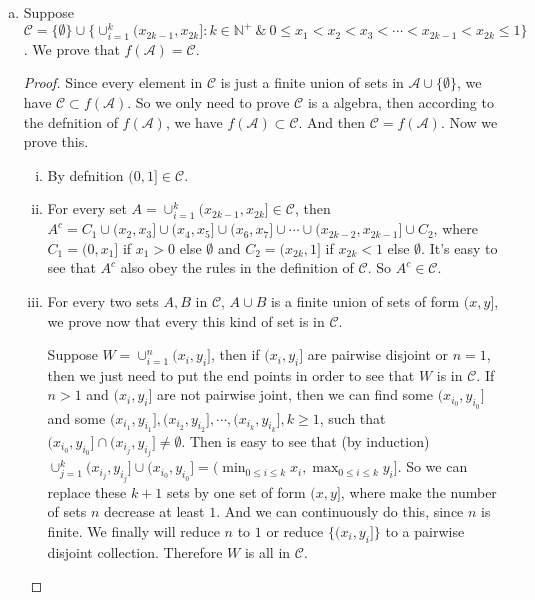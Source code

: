 \documentclass[11pt]{article}
\begin{document}
\begin{enumerate}[1.]
\begin{enumerate}[(a)]
        \item
        Suppose $\mathcal{C} = \{\emptyset\} \cup \{\cup_{i=1}^k (x_{2k-1}, x_{2k}] : k \in \mathbb{N}^+\ \& \ 0 \le x_1 < x_2 < x_3 < \cdots < x_{2k-1} < x_{2k} \le 1\}$.
        We prove that $f(\mathcal{A}) = \mathcal{C}$.
        \begin{proof}
            Since every element in $\mathcal{C}$ is just a finite union of sets in $\mathcal{A} \cup \{\emptyset\}$, we have $\mathcal{C} \subset f(\mathcal{A})$.
            So we only need to prove $\mathcal{C}$ is a algebra, then according to the defnition of $f(\mathcal{A})$, we have $f(\mathcal{A}) \subset \mathcal{C}$.
            And then $\mathcal{C} = f(\mathcal{A})$. Now we prove this.
            \begin{enumerate}[i.]
                \item By defnition $(0,1] \in \mathcal{C}$.
                \item For every set $A = \cup_{i=1}^k (x_{2k-1}, x_{2k}] \in \mathcal{C}$, then $A^c = C_1 \cup (x_2,x_3] \cup (x_4,x_5] \cup (x_6,x_7] \cup \cdots \cup (x_{2k-2},x_{2k-1}] \cup C_2$, where $C_1 = (0,x_1]$ if $x_1 > 0$ else $\emptyset$ and $C_2 = (x_{2k},1]$ if $x_{2k} < 1$ else $\emptyset$.
                It's easy to see that $A^c$ also obey the rules in the definition of $\mathcal{C}$.
                So $A^c \in \mathcal{C}$.
                \item For every two sets $A, B$ in $\mathcal{C}$, $A \cup B$ is a finite union of sets of form $(x,y]$, we prove now that every this kind of set is in $\mathcal{C}$.

                Suppose $W = \cup_{i=1}^n (x_i, y_i]$, then if $(x_i, y_i]$ are pairwise disjoint or $n = 1$, then we just need to put the end points in order to see that $W$ is in $\mathcal{C}$.
                If $n > 1$ and $(x_i, y_i]$ are not pairwise joint, then we can find some $(x_{i_0},y_{i_0}]$ and some $(x_{i_1},y_{i_1}],(x_{i_2},y_{i_2}], \cdots ,(x_{i_k},y_{i_k}], k \ge 1$, such that $(x_{i_0},y_{i_0}] \cap (x_{i_j},y_{i_j}] \neq \emptyset$.
                Then is easy to see that (by induction) $\cup_{j=1}^k (x_{i_j},y_{i_j}] \cup (x_{i_0},y_{i_0}] = (\min_{0\le i \le k} x_i, \max_{0\le i \le k} y_i]$. So we can replace these $k+1$ sets by one set of form $(x,y]$, where make the number of sets $n$ decrease at least $1$. 
                And we can continuously do this, since $n$ is finite. We finally will reduce $n$ to $1$ or reduce $\{(x_i,y_i]\}$ to a pairwise disjoint collection. Therefore $W$ is all in $\mathcal{C}$.


\end{enumerate}
\end{proof}
\end{enumerate}
\end{enumerate}
\end{document}
